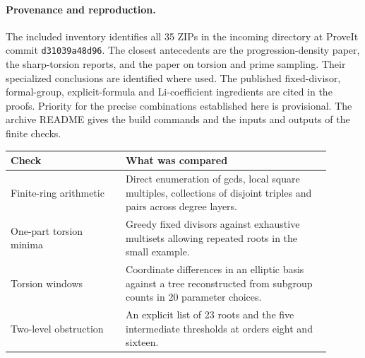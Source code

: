 \documentclass[11pt,letterpaper]{article}
\begin{document}
\paragraph{Provenance and reproduction.}
The included inventory identifies all 35 ZIPs in the incoming directory
at ProveIt commit \texttt{d31039a48d96}. The closest antecedents are the
progression-density paper, the sharp-torsion reports, and the paper on
torsion and prime sampling. Their specialized conclusions are identified
where used. The published fixed-divisor, formal-group, explicit-formula
and Li-coefficient ingredients are cited in the proofs. Priority for the
precise combinations established here is provisional.
The archive README gives the build commands and the inputs and outputs
of the finite checks.
\begin{center}
\begin{tabular}{@{}p{0.32\linewidth}p{0.58\linewidth}@{}}\toprule
\textsf{Check} & \textsf{What was compared}\\\midrule
Finite-ring arithmetic & Direct enumeration of gcds, local square multiples,
collections of disjoint triples and pairs across degree layers.\\[3pt]
One-part torsion minima & Greedy fixed divisors against exhaustive multisets
allowing repeated roots in the small example.\\[3pt]
Torsion windows & Coordinate differences in an elliptic basis against a
tree reconstructed from subgroup counts in 20 parameter choices.\\[3pt]
Two-level obstruction & An explicit list of 23 roots and the five intermediate
thresholds at orders eight and sixteen.\\\bottomrule
\end{tabular}
\end{center}
\end{document}
